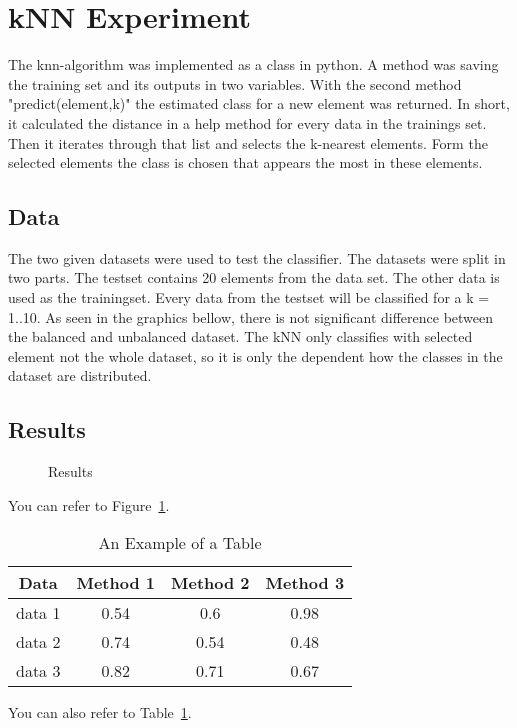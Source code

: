 \documentclass[a4paper,12pt]{article}
\newcommand{\initials}[1]{\marginpar{\quad\texttt{#1}}}
\begin{document}
\section{kNN Experiment}
The knn-algorithm was implemented as a class in python. A method was saving the training set and its outputs in two variables. With the second method "predict(element,k)" the estimated class for a new element was returned. In short, it calculated the distance in a help method for every data in the trainings set. Then it iterates through that list and selects the k-nearest elements. Form the selected elements the class is chosen that appears the most in these elements.

\initials{MA}
\subsection{Data}
The two given datasets were used to test the classifier. The datasets were split in two parts. The testset contains 20 elements from the data set. The other data is used as the trainingset. Every data from the testset will be classified for a k = 1..10. As seen in the graphics bellow, there is not significant difference between the balanced and unbalanced dataset. The kNN only classifies with selected element not the whole dataset, so it is only the dependent how the classes in the dataset are distributed.

\initials{MA}
\subsection{Results}

\begin{figure}[h]
\centering
\caption{Results}
\label{fig_res}
\end{figure}


You can refer to Figure~\ref{fig_res}.
\begin{table}[h]
\caption{An Example of a Table}
\label{tab_example}
\centering
\begin{tabular}{c||c|c|c}
Data & Method 1 & Method 2 & Method 3\\
\hline\hline
data 1 &0.54 & 0.6& 0.98\\
\hline
data 2 &0.74 & 0.54& 0.48\\
\hline
data 3 &0.82 & 0.71& 0.67
\end{tabular}
\end{table}
You can also refer to Table~\ref{tab_example}.
\initials{FGM}
\end{document}
